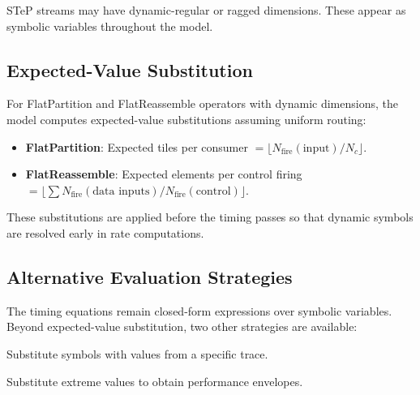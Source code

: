 \documentclass[10pt]{article}
\begin{document}
STeP streams may have dynamic-regular or ragged dimensions. These appear as symbolic variables throughout the model.

\subsection{Expected-Value Substitution}

For FlatPartition and FlatReassemble operators with dynamic dimensions, the model computes expected-value substitutions assuming uniform routing:
\begin{itemize}[nosep]
    \item \textbf{FlatPartition}: Expected tiles per consumer $= \lfloor N_{\text{fire}}(\text{input}) / N_c \rfloor$.
    \item \textbf{FlatReassemble}: Expected elements per control firing $= \lfloor \sum N_{\text{fire}}(\text{data inputs}) / N_{\text{fire}}(\text{control}) \rfloor$.
\end{itemize}
These substitutions are applied before the timing passes so that dynamic symbols are resolved early in rate computations.

\subsection{Alternative Evaluation Strategies}

The timing equations remain closed-form expressions over symbolic variables. Beyond expected-value substitution, two other strategies are available:
\begin{description}[leftmargin=1.5em, labelindent=0em]
    \item[Concrete instantiation.] Substitute symbols with values from a specific trace.
    \item[Worst/best-case bounds.] Substitute extreme values to obtain performance envelopes.
\end{description}
\end{document}
